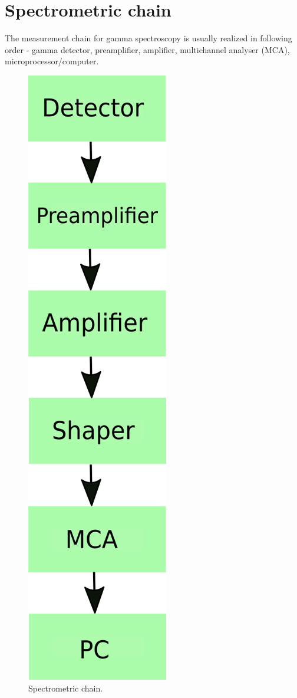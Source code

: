 \section{Spectrometric chain}
The measurement chain for gamma spectroscopy is usually realized in following order - gamma detector, preamplifier, amplifier, multichannel analyser (MCA), microprocessor/computer.


\begin{figure}[H]
 \centering
 \includegraphics[scale=0.35, angle = 0]{./pictures/chain.png}
 \caption{Spectrometric chain.}
 \label{chain}
 
\end{figure}

